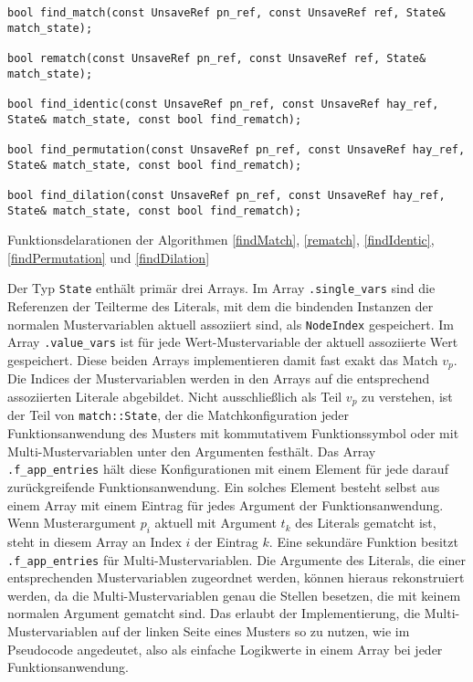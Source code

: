\begin{listing}
\footnotesize
\begin{verbatim}
bool find_match(const UnsaveRef pn_ref, const UnsaveRef ref, State& match_state);

bool rematch(const UnsaveRef pn_ref, const UnsaveRef ref, State& match_state);

bool find_identic(const UnsaveRef pn_ref, const UnsaveRef hay_ref, State& match_state, const bool find_rematch);

bool find_permutation(const UnsaveRef pn_ref, const UnsaveRef hay_ref, State& match_state, const bool find_rematch);

bool find_dilation(const UnsaveRef pn_ref, const UnsaveRef hay_ref, State& match_state, const bool find_rematch);
\end{verbatim}
\caption{Funktionsdelarationen der Algorithmen \ref{findMatch}, \ref{rematch}, \ref{findIdentic}, \ref{findPermutation} und \ref{findDilation}}
\label{codeRematchDecl}
\end{listing}

Der Typ \verb|State| enthält primär drei Arrays. Im Array \verb|.single_vars| sind die Referenzen der Teilterme des Literals, mit dem die bindenden Instanzen der normalen Mustervariablen aktuell assoziiert sind, als \verb|NodeIndex| gespeichert.
Im Array \verb|.value_vars| ist für jede Wert-Mustervariable der aktuell assoziierte Wert gespeichert. Diese beiden Arrays implementieren damit fast exakt das Match $v_p$. Die Indices der Mustervariablen werden in den Arrays auf die entsprechend assoziierten Literale abgebildet.
Nicht ausschließlich als Teil $v_p$ zu verstehen, ist der Teil von \verb|match::State|, der die Matchkonfiguration jeder Funktionsanwendung des Musters mit kommutativem Funktionssymbol oder mit Multi-Mustervariablen unter den Argumenten festhält. Das Array \verb|.f_app_entries| hält diese Konfigurationen mit einem Element für jede darauf zurückgreifende Funktionsanwendung. Ein solches Element besteht selbst aus einem Array mit einem Eintrag für jedes Argument der Funktionsanwendung. Wenn Musterargument $p_i$ aktuell mit Argument $t_k$ des Literals gematcht ist, steht in diesem Array an Index $i$ der Eintrag $k$. Eine sekundäre Funktion besitzt \verb|.f_app_entries| für Multi-Mustervariablen. Die Argumente des Literals, die einer entsprechenden Mustervariablen zugeordnet werden, können hieraus rekonstruiert werden, da die Multi-Mustervariablen genau die Stellen besetzen, die mit keinem normalen Argument gematcht sind. Das erlaubt der Implementierung, die Multi-Mustervariablen auf der linken Seite eines Musters so zu nutzen, wie im Pseudocode angedeutet, also als einfache Logikwerte in einem Array bei jeder Funktionsanwendung. 




